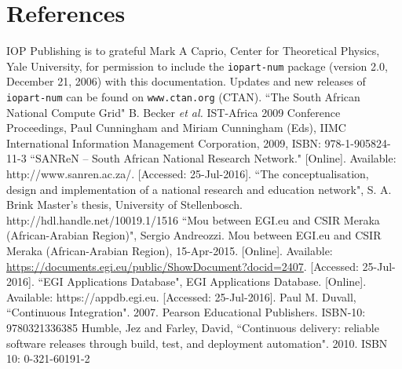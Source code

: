 \documentclass[a4paper]{jpconf}
\begin{document}
\section*{References}
\begin{thebibliography}{9}
 IOP Publishing is to grateful Mark A Caprio, Center for Theoretical Physics, Yale University, for permission to include the {\tt iopart-num} \BibTeX package (version 2.0, December 21, 2006) with  this documentation. Updates and new releases of {\tt iopart-num} can be found on \verb"www.ctan.org" (CTAN).
  ``The South African National Compute Grid" B. Becker {\it et al.} IST-Africa 2009 Conference Proceedings, Paul Cunningham and Miriam Cunningham (Eds), IIMC International Information Management Corporation, 2009, ISBN: 978-1-905824-11-3
 ``SANReN – South African National Research Network." [Online]. Available: http://www.sanren.ac.za/. [Accessed: 25-Jul-2016].
 ``The conceptualisation, design and implementation of a national research and education network", S. A. Brink Master's thesis, University of Stellenbosch. http://hdl.handle.net/10019.1/1516
 ``Mou between EGI.eu and CSIR Meraka (African-Arabian Region)", Sergio Andreozzi. Mou between EGI.eu and CSIR Meraka (African-Arabian Region), 15-Apr-2015. [Online]. Available: \url{https://documents.egi.eu/public/ShowDocument?docid=2407}. [Accessed: 25-Jul-2016].
 ``EGI Applications Database", EGI Applications Database. [Online]. Available: https://appdb.egi.eu. [Accessed: 25-Jul-2016].
 Paul M. Duvall, ``Continuous Integration". 2007. Pearson Educational Publishers.  ISBN-10: 9780321336385
 Humble, Jez and Farley, David, ``Continuous delivery: reliable software releases through build, test, and deployment automation". 2010. ISBN 10: 0-321-60191-2
\end{thebibliography}

% 
\end{document}
